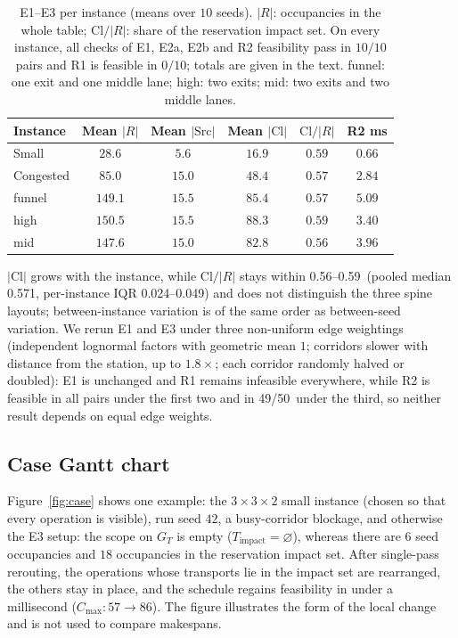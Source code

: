 \documentclass[manuscript,screen,review]{acmart}
\newcommand{\NSeeds}{10}
\newcommand{\NPairs}{50}
\newcommand{\EoneCloLo}{0.56}
\newcommand{\EoneCloHi}{0.59}
\newcommand{\EoneFracIqrLo}{0.024}  %
\newcommand{\EoneFracIqrHi}{0.049}  %
\newcommand{\EoneFracMed}{0.571}    %
\newcommand{\WeightSplitRtwo}{49/\NPairs}
\begin{document}
\begin{table}[t]
\centering
\caption{E1--E3 per instance (means over \(\NSeeds\) seeds). \(|R|\): occupancies in the whole table; \(\mathrm{Cl}/|R|\): share of the reservation impact set.
On every instance, all checks of E1, E2a, E2b and R2 feasibility pass in \(10/10\) pairs and R1 is feasible in \(0/10\); totals are given in the text.
funnel: one exit and one middle lane; high: two exits; mid: two exits and two middle lanes.}
\label{tab:e1}
\small
\begin{tabular}{@{}lccccc@{}}
\toprule
Instance & Mean \(|R|\) & Mean \(|\mathrm{Src}|\) & Mean \(|\mathrm{Cl}|\) & \(\mathrm{Cl}/|R|\) & R2 ms \\
\midrule
Small      & \(28.6\)  & \(5.6\)  & \(16.9\) & \(0.59\) & \(0.66\) \\
Congested  & \(85.0\)  & \(15.0\) & \(48.4\) & \(0.57\) & \(2.84\) \\
funnel  & \(149.1\) & \(15.5\) & \(85.4\) & \(0.57\) & \(5.09\) \\
high    & \(150.5\) & \(15.5\) & \(88.3\) & \(0.59\) & \(3.40\) \\
mid     & \(147.6\) & \(15.0\) & \(82.8\) & \(0.56\) & \(3.96\) \\
\bottomrule
\end{tabular}
\end{table}

\(|\mathrm{Cl}|\) grows with the instance, while \(\mathrm{Cl}/|R|\) stays within \EoneCloLo--\EoneCloHi\ (pooled median \EoneFracMed, per-instance IQR \EoneFracIqrLo--\EoneFracIqrHi)
and does not distinguish the three spine layouts; between-instance variation is of the same order as between-seed variation.
We rerun E1 and E3 under three non-uniform edge weightings (independent lognormal factors with geometric mean \(1\); corridors slower with distance from the station, up to \(1.8\times\); each corridor randomly halved or doubled):
E1 is unchanged and R1 remains infeasible everywhere, while R2 is feasible in all pairs under the first two and in \WeightSplitRtwo\ under the third, so neither result depends on equal edge weights.

\subsection{Case Gantt chart}
\label{sec:case}

Figure~\ref{fig:case} shows one example: the \(3\times3\times2\) small instance (chosen so that every operation is visible), run seed \(42\), a busy-corridor blockage, and otherwise the E3 setup: the scope on \(G_T\) is empty (\(T_{\mathrm{impact}}=\varnothing\)), whereas there are \(6\) seed occupancies and \(18\) occupancies in the reservation impact set.
After single-pass rerouting, the operations whose transports lie in the impact set are rearranged, the others stay in place, and the schedule regains feasibility in under a millisecond (\(C_{\max}:57\to 86\)).
The figure illustrates the form of the local change and is not used to compare makespans.
\end{document}
